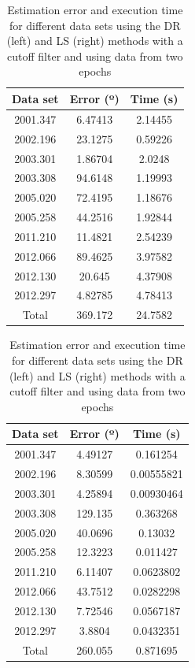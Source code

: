 \begin{table}[h!]
	\centering
	\def\arraystretch{1.2}
	\begin{tabular}{|c c c|} 
		\hline
		Data set & Error (º) & Time (s) \\ [0.5ex] 
		\hline\hline
		2001.347 & 6.47413 & 2.14455 \\
		\hline
		2002.196 & 23.1275 & 0.59226 \\
		\hline
		2003.301 & 1.86704 & 2.0248 \\
		\hline
		2003.308 & 94.6148 & 1.19993 \\
		\hline
		2005.020 & 72.4195 & 1.18676 \\
		\hline
		2005.258 & 44.2516 & 1.92844 \\
		\hline
		2011.210 & 11.4821 & 2.54239 \\
		\hline
		2012.066 & 89.4625 & 3.97582 \\
		\hline
		2012.130 & 20.645 & 4.37908 \\
		\hline
		2012.297 & 4.82785 & 4.78413 \\
		\hline
		Total & 369.172 & 24.7582\\
		\hline
	\end{tabular}
	\quad\quad\quad
	\begin{tabular}{|c c c|} 
		\hline
		Data set & Error (º) & Time (s) \\ [0.5ex] 
		\hline\hline
		2001.347 & 4.49127 & 0.161254 \\
		\hline
		2002.196 & 8.30599 & 0.00555821 \\
		\hline
		2003.301 & 4.25894 & 0.00930464 \\
		\hline
		2003.308 & 129.135 & 0.363268 \\
		\hline
		2005.020 & 40.0696 & 0.13032 \\
		\hline
		2005.258 & 12.3223 & 0.011427 \\
		\hline
		2011.210 & 6.11407 & 0.0623802 \\
		\hline
		2012.066 & 43.7512 & 0.0282298 \\
		\hline
		2012.130 & 7.72546 & 0.0567187 \\
		\hline
		2012.297 & 3.8804 & 0.0432351 \\
		\hline
		Total & 260.055 & 0.871695\\
		\hline
	\end{tabular}
	\caption{Estimation error and execution time for different data sets using the DR (left) and LS (right) methods with a cutoff filter and using data from two epochs}
\end{table}

